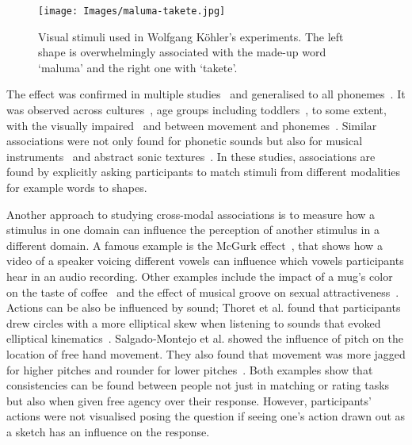 \documentclass[]{interact}
\theoremstyle{plain}%
\theoremstyle{definition}
\theoremstyle{remark}
\begin{document}
\begin{figure}[h]
\centering
\texttt{[image: Images/maluma-takete.jpg]}
\caption{Visual stimuli used in Wolfgang K{\"o}hler's experiments. The left shape is overwhelmingly associated with the made-up word `maluma' and the right one with `takete'.}
\end{figure}

The effect was confirmed in multiple studies~\cite{ramachandranSynaesthesiaWindowPerception} and generalised to all phonemes~\cite{nielsenParsingRoleConsonants2013}. It was observed across cultures~\cite{davisFitnessNamesDrawings1961,taylorPhoneticSymbolismFour1962,bremnerBoubaKikiNamibia2013}, age groups including toddlers~\cite{maurerShapeBoubasSound2006}, to some extent, with the visually impaired~\cite{bottiniSoundSymbolismSighted2019} and between movement and phonemes~\cite{shinoharaTaketeMalumaAction2016}. Similar associations were not only found for phonetic sounds but also for musical instruments~\cite{adeliAudiovisualCorrespondenceMusical2014} and abstract sonic textures~\cite{grillVisualizationPerceptualQualities2012}. In these studies, associations are found by explicitly asking participants to match stimuli from different modalities for example words to shapes. 

Another approach to studying cross-modal associations is to measure how a stimulus in one domain can influence the perception of another stimulus in a different domain. A famous example is the McGurk effect~\cite{}, that shows how a video of a speaker voicing different vowels can influence which vowels participants hear in an audio recording. Other examples include the impact of a mug's color on the taste of coffee~\cite{van2014does} and the effect of musical groove on sexual attractiveness~\cite{}. Actions can be also be influenced by sound; Thoret et al. found that participants drew circles with a more elliptical skew when listening to sounds that evoked elliptical kinematics~\cite{thoretSeeingCirclesDrawing2016}. Salgado‑Montejo et al. showed the influence of pitch on the location of free hand movement. They also found that movement was more jagged for higher pitches and rounder for lower pitches~\cite{spence_paper}. Both examples show that consistencies can be found between people not just in matching or rating tasks but also when given free agency over their response. However, participants' actions were not visualised posing the question if seeing one's action drawn out as a sketch has an influence on the response. 
\end{document}
